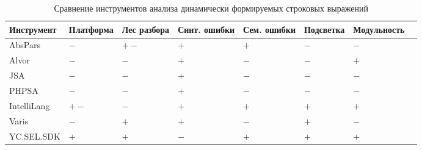 \begin{table} [htbp]
  \centering
\parbox{14cm}{\caption{Сравнение инструментов анализа динамически формируемых строковых выражений}\label{tbl:comparison}}
\begin{threeparttable}
  
  \begin{tabular}{| p{2.6cm} || p{2cm} | p{1.8cm} | p{1.8cm} | p{1.8cm} | p{2cm} | p{2cm}l |}
  \hline                               
  \hline
  \small{Инструмент}   &\centering \small{Платформа} &\centering \small{Лес разбора}      &\centering \small{Синт. ошибки} &\centering \small{Сем. ошибки} &\centering \small{Подсветка} &\centering \small{Модульность} & \\
  \hline 
  AbsPars      &\centering  $-$      &\centering  $+-$\tnote{a}                 &\centering  $+$                  &\centering  $+$                 &\centering  $-$                 &\centering  $-$        & \\
  Alvor        &\centering  $-$      &\centering  $-$                    &\centering  $+$                  &\centering  $-$                 &\centering  $-$                 &\centering  $+$        &\\
  JSA          &\centering  $-$      &\centering  $-$                    &\centering  $+$                  &\centering  $-$                 &\centering  $-$                 &\centering  $-$        &\\
  PHPSA        &\centering  $-$      &\centering  $-$                    &\centering  $+$                  &\centering  $-$                 &\centering  $-$                 &\centering  $-$        &\\
  IntelliLang  &\centering  $+-$\tnote{b}   &\centering  $-$                    &\centering  $+$                  &\centering  $+$                 &\centering  $+$                 &\centering  $+$        &\\
  Varis        &\centering  $-$      &\centering  $+$\tnote{c}                  &\centering  $+$                  &\centering  $-$                 &\centering  $+$                 &\centering  $-$        &\\
  YC.SEL.SDK   &\centering  $+$      &\centering  $+$                    &\centering  $-$\tnote{d}                &\centering  $+$                 &\centering  $+$                 &\centering  $+$        &\\
  \hline
  \hline
  \end{tabular}
  \begin{tablenotes}

\end{tablenotes}
\end{threeparttable}
\end{table}
